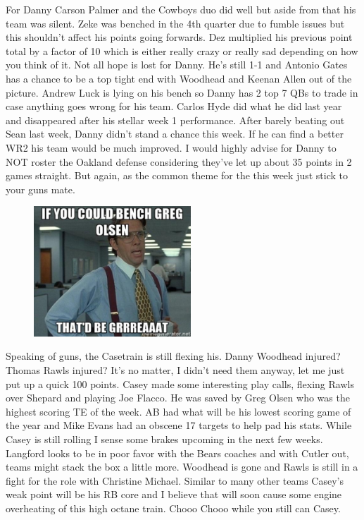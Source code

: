 \documentclass[11pt,letterpaper]{article}
\begin{document}
\newpage
{}
\par\noindent For Danny Carson Palmer and the Cowboys duo did well but aside from that his team was silent. Zeke was benched in the 4th quarter due to fumble issues but this shouldn't affect his points going forwards. Dez multiplied his previous point total by a factor of 10 which is either really crazy or really sad depending on how you think of it. Not all hope is lost for Danny. He's still 1-1 and Antonio Gates has a chance to be a top tight end with Woodhead and Keenan Allen out of the picture. Andrew Luck is lying on his bench so Danny has 2 top 7 QBs to trade in case anything goes wrong for his team. Carlos Hyde did what he did last year and disappeared after his stellar week 1 performance. After barely beating out Sean last week, Danny didn't stand a chance this week. If he can find a better WR2 his team would be much improved. I would highly advise for Danny to NOT roster the Oakland defense considering they've let up about 35 points in 2 games straight. But again, as the common theme for the this week just stick to your guns mate.
\begin{figure}
\centering
\includegraphics[width=0.525\textwidth]{week2-olsen.png}
\label{fig:week2-olsen}
\end{figure} 
\bigskip
\par\noindent Speaking of guns, the Casetrain is still flexing his. Danny Woodhead injured? Thomas Rawls injured? It's no matter, I didn't need them anyway, let me just put up a quick 100 points. Casey made some interesting play calls, flexing Rawls over Shepard and playing Joe Flacco. He was saved by Greg Olsen who was the highest scoring TE of the week. AB had what will be his lowest scoring game of the year and Mike Evans had an obscene 17 targets to help pad his stats. While Casey is still rolling I sense some brakes upcoming in the next few weeks. Langford looks to be in poor favor with the Bears coaches and with Cutler out, teams might stack the box a little more. Woodhead is gone and Rawls is still in a fight for the role with Christine Michael. Similar to many other teams Casey's weak point will be his RB core and I believe that will soon cause some engine overheating of this high octane train. Chooo Chooo while you still can Casey. 
\end{document}
